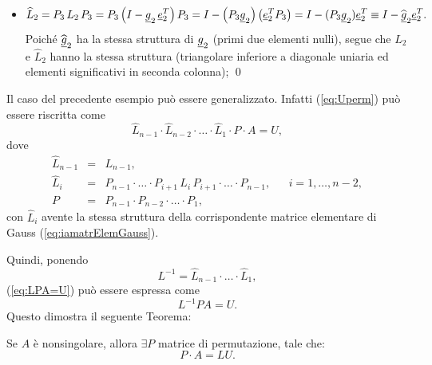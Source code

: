 \begin{example}
\begin{itemize}
        \item \begin{equation*}
            \widehat L_2 = P_3\, L_2\, P_3=P_3\left(I-\uline g_2\,\uline e_2^T\right)P_3 = I-\left(P_3\uline g_2\right)\left(\uline e_2^TP_3\right)=I-(P_3\uline g_2)\uline e_2^T\equiv I-\widehat{\uline g}_2\uline e_2^T.
        \end{equation*} Poiché $\widehat{\uline g}_2$ ha la stessa struttura di $\uline g_2$ (primi due elementi nulli), segue che $L_2$ e $\widehat L_2$ hanno la stessa struttura (triangolare inferiore a diagonale uniaria ed elementi significativi in seconda colonna);
        \qed
    \end{itemize}
    
    \addtocounter{footnote}{-2}
    
    
\end{example}

Il caso del precedente esempio può essere generalizzato. Infatti (\ref{eq:Uperm}) può essere riscritta come 
\begin{equation}\label{eq:LPA=U}
    \widehat L_{n-1}\cdot \widehat L_{n-2}\cdot\hdots\cdot \widehat L_{1}\cdot P \cdot A = U,
\end{equation}
dove
\begin{equation*}
    \begin{matrix}
        \widehat L_{n-1} &=& L_{n-1},\\
        \widehat L_i &=& P_{n-1}\cdot\hdots\cdot P_{i+1}\, L_i\, P_{i+1}\cdot\hdots\cdot P_{n-1}, && i=1,\hdots,n-2,\\
        P &=& P_{n-1}\cdot P_{n-2}\cdot \hdots\cdot P_1,
    \end{matrix}
\end{equation*}
con $\widehat L_i$ avente la stessa struttura della corrispondente matrice elementare di Gauss (\ref{eq:iamatrElemGauss}).

Quindi, ponendo
\begin{equation*}
    L^{-1} = \widehat L_{n-1}\cdot\hdots\cdot\widehat L_1,
\end{equation*}
(\ref{eq:LPA=U}) può essere espressa come
\begin{equation*}
    L^{-1} P A = U.
\end{equation*}
Questo dimostra il seguente Teorema:
\begin{theorem}\label{th:fattLUPerm}\footnotemark
    Se $A$ è nonsingolare, allora $\exists P$ matrice di permutazione, tale che:
    \begin{equation}\label{eq:PA=LU}
        P\cdot A = LU.
    \end{equation}
\end{theorem}

